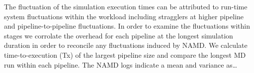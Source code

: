 The fluctuation of the simulation execution times can be attributed to
run-time system fluctuations within the workload including stragglers at
higher pipeline and pipeline-to-pipeline fluctuations. In order to examine
the fluctuations within stages we corrolate the overhead for each pipeline at
the longest simulation duration in order to reconcile any fluctuations
induced by NAMD\@. We calculate time-to-execution (Tx) of the largest
pipeline size and compare the longest MD run within each pipeline. The NAMD
logs indicate a mean and variance as\ldots















